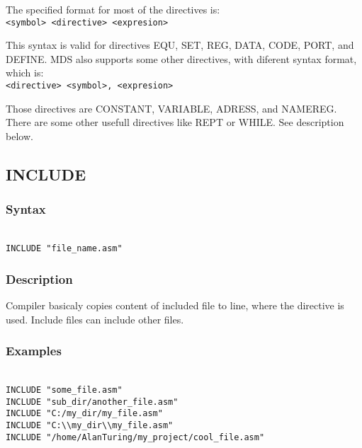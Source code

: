     The specified format for most of the directives is:
    {
        ~\\
        \usecodefont
        \verb'<symbol> <directive> <expresion>'
    }

    \bigskip

    This syntax is valid for directives EQU, SET, REG, DATA, CODE, PORT, and DEFINE. MDS also supports some other directives, with diferent syntax format, which is:
    {
        ~\\
        \usecodefont
        \verb'<directive> <symbol>, <expresion>'
    }

    \bigskip

    Those directives are CONSTANT, VARIABLE, ADRESS, and NAMEREG. There are some other usefull directives like REPT or WHILE. See description below.

    \clearpage
    \subsection{INCLUDE}
        \subsubsection{Syntax}
        {
            ~\\
            \usecodefont
            \verb'INCLUDE "file_name.asm"'
        }
        \subsubsection{Description}
            Compiler basicaly copies content of included file to line, where the directive is used. Include files can include other files.

        \subsubsection{Examples}
        {
            ~\\
            \usecodefont
            \verb'INCLUDE "some_file.asm"'\\
            \verb'INCLUDE "sub_dir/another_file.asm"'\\
            \verb'INCLUDE "C:/my_dir/my_file.asm"'\\
            \verb'INCLUDE "C:\\my_dir\\my_file.asm"'\\
            \verb'INCLUDE "/home/AlanTuring/my_project/cool_file.asm"'\\
        }


